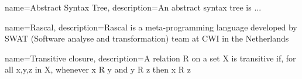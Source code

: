 \documentclass[main.tex]{subfiles}
\begin{document}
    {
        name=Abstract Syntax Tree,
        description={An abstract syntax tree is ...}
    }
    
    {
        name=Rascal,
        description={Rascal is a meta-programming language developed by SWAT (Software analyse and transformation) team at CWI in the Netherlands}
    }
    
    {
        name=Transitive closure,
        description={A relation R on a set X is transitive if, for all x,y,z in X, whenever x R y and y R z then x R z}
    }
\end{document}

